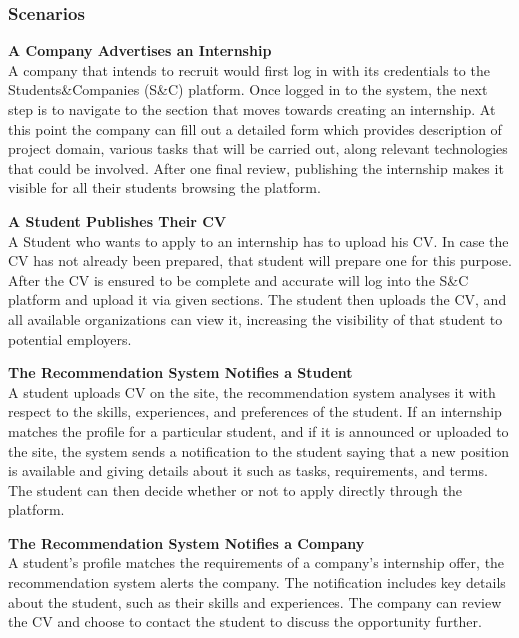 \documentclass[12pt]{article}
\numberwithin{figure}{section}
\numberwithin{table}{section}
\begin{document}
\subsubsection{Scenarios}

\textbf{A Company Advertises an Internship} \\
A company that intends to recruit would first log in with its credentials to the Students\&Companies (S\&C) platform. Once logged in to the system, the next step is to navigate to the section that moves towards creating an internship. At this point the company can fill out a detailed form which provides description of project domain, various tasks that will be carried out, along relevant technologies that could be involved. After one final review, publishing the internship makes it visible for all their students browsing the platform.

\vspace{0.5cm}

\textbf{A Student Publishes Their CV} \\
A Student who wants to apply to an internship has to upload his CV. In case the CV has not already been prepared, that student will prepare one for this purpose. After the CV is ensured to be complete and accurate will log into the S\&C platform and upload it via given sections. The student then uploads the CV, and all available organizations can view it, increasing the visibility of that student to potential employers.

\vspace{0.5cm}

\textbf{The Recommendation System Notifies a Student} \\
A student uploads CV on the site, the recommendation system analyses it with respect to the skills, experiences, and preferences of the student. If an internship matches the profile for a particular student, and if it is announced or uploaded to the site, the system sends a notification to the student saying that a new position is available and giving details about it such as tasks, requirements, and terms. The student can then decide whether or not to apply directly through the platform.

\vspace{0.5cm}

\textbf{The Recommendation System Notifies a Company} \\
A student’s profile matches the requirements of a company’s internship offer, the recommendation system alerts the company. The notification includes key details about the student, such as their skills and experiences. The company can review the CV and choose to contact the student to discuss the opportunity further.
\end{document}
